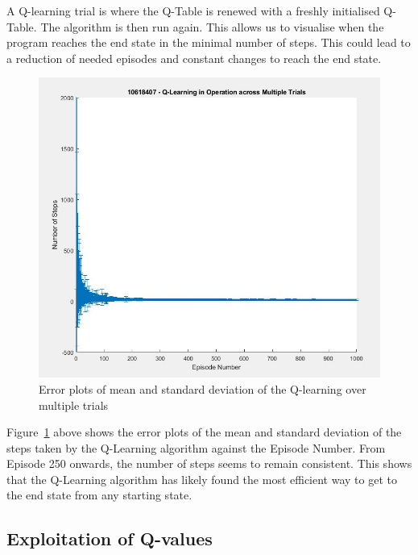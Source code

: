 \documentclass [11pt]{article}
\begin{document}
A Q-learning trial is where the Q-Table is renewed with a freshly initialised Q-Table. The algorithm is then run again. This allows us to visualise when the program reaches the end state in the minimal number of steps. This could lead to a reduction of needed episodes and constant changes to reach the end state. 

\begin{figure}[H]
\centerline{\includegraphics[width=15cm]{Q-learning_in_operation_across_multiple_trials}}
\caption{Error plots of mean and standard deviation of the Q-learning over multiple trials}
\label{fig:error_plot_across_multiple_trials}
\end{figure}

Figure~\ref{fig:error_plot_across_multiple_trials} above shows the error plots of the mean and standard deviation of the steps taken by the Q-Learning algorithm against the Episode Number. From Episode 250 onwards, the number of steps seems to remain consistent. This shows that the Q-Learning algorithm has likely found the most efficient way to get to the end state from any starting state. 

\subsection{Exploitation of Q-values}
\end{document}
